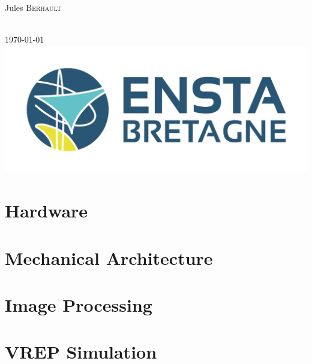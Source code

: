 \documentclass[12pt]{article}
\begin{document}
\begin{titlepage}
\begin{minipage}{0.4\textwidth}
        \begin{flushleft} \large
            Jules \textsc{Berhault}\\  %
            \end{flushleft}
\end{minipage}\\[1cm]
{\large \today}\\[1cm] %
\includegraphics{ENSTA1246-524.png}%
\vfill %

\end{titlepage}

\tableofcontents          %
\listoffigures
\listoftables
\newpage








\section{Hardware}


\section{Mechanical Architecture}


\section{Image Processing}


\section{VREP Simulation}

\end{document}

